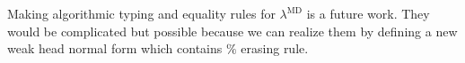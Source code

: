 \documentclass[runningheads]{llncs}
\newcommand{\LMD}{$\lambda^{\textrm{MD}}$\xspace}
\begin{document}
									Making algorithmic typing and equality rules for \LMD is a future work.
									They would be complicated but possible 
									because we can realize them by defining a new weak head normal form which contains $\%$ erasing rule.
									
\end{document}
